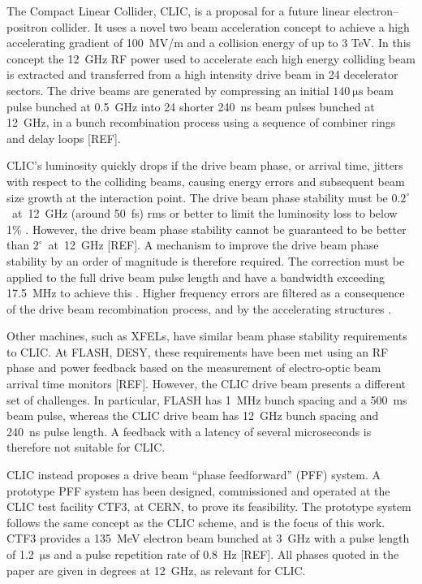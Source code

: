 \documentclass[%
 reprint,
superscriptaddress,
 amsmath,amssymb,
 prl,
]{revtex4-1}
\begin{document}
The Compact Linear Collider, CLIC, \cite{CLICCDR} is a proposal for a future 
linear electron--positron collider. It uses a novel two beam acceleration 
concept to achieve a high accelerating gradient of 100~MV/m 
and a collision energy of up to 3 TeV. In this concept the 12~GHz RF power used 
to accelerate each high energy colliding beam is extracted and transferred from 
a high intensity drive beam in 24 decelerator sectors. The 
drive beams are generated by compressing an initial 
\(140~\mathrm{\mu s}\) beam pulse bunched at 0.5~GHz into 24 shorter 240~ns 
beam pulses bunched at 12~GHz, in a bunch recombination process using a 
sequence of combiner rings and delay loops [REF].

CLIC's luminosity quickly drops if the drive beam phase, or arrival time, 
jitters with respect to the colliding beams, causing energy errors and 
subsequent beam size growth at the interaction point. The drive beam phase 
stability must be \(0.2^\circ\)~at~12~GHz (around 50~fs) rms or better to limit 
the luminosity loss to below 1\% \cite{CLICCDR}.  However, the drive beam phase 
stability cannot be guaranteed to be better than \(2^\circ\)~at~12~GHz [REF]. A 
mechanism to improve the drive beam phase stability by an order of magnitude is 
therefore required. The correction must be applied to the full drive beam pulse 
length and have a bandwidth exceeding 17.5~MHz to achieve this 
\cite{Gerber2015}. Higher frequency errors are filtered as a consequence of the 
drive beam recombination process, and by the accelerating structures 
\cite{Gerber2015}.

Other machines, such as XFELs, have similar beam phase stability 	
requirements to CLIC. At FLASH, DESY, these requirements have been met	using 
an RF phase and power feedback based on the measurement of electro-optic beam 
arrival time monitors [REF]. However, the CLIC drive beam presents a different 
set of challenges. In particular, FLASH has 1~MHz bunch spacing and a 500~ms 
beam pulse, whereas the CLIC drive beam has 12~GHz bunch spacing and 240~ns 
pulse length. A feedback with a latency of several microseconds is therefore 
not suitable for CLIC.

CLIC instead proposes a drive beam ``phase feedforward'' (PFF) 
system. A prototype PFF system has been designed, commissioned and operated at 
the CLIC test facility CTF3, at CERN, to prove its feasibility. The prototype 
system follows the same concept as the CLIC scheme, and is the focus 
of this work. CTF3 provides a 135~MeV electron beam bunched at 3~GHz with a 
pulse length of 1.2~\(\mathrm{\mu s}\) and a pulse repetition rate of 0.8~Hz 
[REF]. All phases quoted in the paper are given in degrees at 12~GHz, as 
relevant for CLIC.
\end{document}
